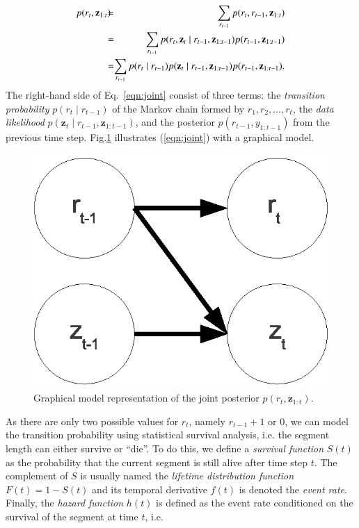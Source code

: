 \begin{eqnarray}
\label{eqn:joint}
p(r_t,\mathbf{z}_{1:t}) \hspace{-0.2cm}&=& \hspace{-0.35cm} \sum_{r_{t-1}}p(r_t,r_{t-1},\mathbf{z}_{1:t})\nonumber\\
               &=& \hspace{-0.35cm} \sum_{r_{t-1}}p(r_t,\mathbf{z}_t\mid r_{t-1},\mathbf{z}_{1:t-1})p(r_{t-1},
                   \mathbf{z}_{1:t-1})\nonumber\\
             &  = &  \hspace{-0.35cm}
             \sum_{r_{t-1}}p(r_t\mid r_{t-1})p(\mathbf{z}_t\mid r_{t-1},\mathbf{z}_{1:t-1})p(r_{t-1},\mathbf{z}_{1:t-1}).
\end{eqnarray}
The right-hand side of Eq.~\eqref{eqn:joint} consist of three terms:
the \emph{transition probability} $p(r_t\mid r_{t-1})$ of the Markov
chain formed by $r_1,r_2,\dots,r_t$, the \emph{data likelihood}
$p(\mathbf{z}_t\mid r_{t-1},\mathbf{z}_{1:t-1})$, and the posterior
$p(r_{t-1},y_{1:t-1})$ from the previous time step. Fig.\ref{fig:model}
illustrates (\ref{eqn:joint}) with a graphical model.

\begin{figure}[t]
\centering
\includegraphics[width=0.5\columnwidth]{fig/model.eps}
\caption{Graphical model representation of the joint posterior
  $p(r_t,\mathbf{z}_{1:t})$.}
\label{fig:model}
\end{figure}

As there are only two possible values for $r_t$, namely
\mbox{$r_{t-1}+1$} or $0$, we can model the transition probability
using statistical survival analysis, i.e. the segment length can
either survive or ``die''. To do this, we define a \emph{survival
  function} $S(t)$ as the probability that the current segment is
still alive after time step $t$. The complement of $S$ is usually
named the \emph{lifetime distribution function} $F(t)= 1- S(t)$ and
its temporal derivative $f(t)$ is denoted the \emph{event rate}.
Finally, the \emph{hazard function} $h(t)$ is defined as the event
rate conditioned on the survival of the segment at time $t$, i.e.

